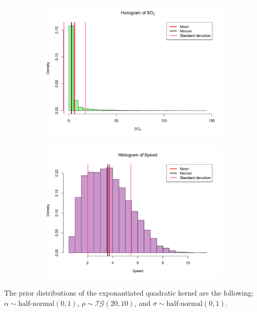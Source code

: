 \documentclass[a4paper, 10pt]{article}
\begin{document}
\begin{flushleft}
\begin{figure}[H]
         \begin{subfigure}[t]{0.48\linewidth}
            \centering
            \includegraphics[width=\linewidth]{../img/so2_hist_2019.png}
         \end{subfigure}
         \hfill
         \begin{subfigure}[t]{0.48\linewidth}
            \centering
            \includegraphics[width=\linewidth]{../img/speed_hist_2019.png}
         \end{subfigure}
      \end{figure}

      The prior distributions of the exponantiated quadratic kernel are the following: $\alpha \sim \text{half-normal}(0, 1)$, $\rho \sim \mathcal{IG}(20, 10)$, and $\sigma \sim \text{half-normal}(0, 1)$.


\end{flushleft}
\end{document}
